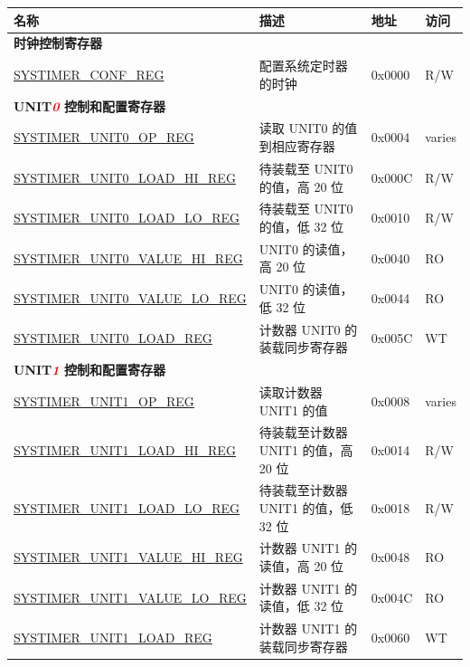 \begin{longtable}{ | p{5.5cm} | p{7.0cm} | p{1.3cm} | p{1.7cm} | }
\hline\rowcolor{lightgray}
名称 & 描述 & 地址 & 访问 \\ \hline
\endhead
\multicolumn{4}{|l|}{\textbf{时钟控制寄存器}} \\ \hline
\hyperref[regdesc:SYSTIMERCONFREG]{SYSTIMER\_CONF\_REG} & 配置系统定时器的时钟 & 0x0000 & R/W \\ \hline
\multicolumn{4}{|l|}{\textbf{UNIT\textcolor{red}{\it{0}} 控制和配置寄存器}} \\ \hline
\hyperref[regdesc:SYSTIMERUNIT0OPREG]{SYSTIMER\_UNIT0\_OP\_REG} & 读取 UNIT0 的值到相应寄存器 & 0x0004 & varies \\ \hline
\hyperref[regdesc:SYSTIMERUNIT0LOADHIREG]{SYSTIMER\_UNIT0\_LOAD\_HI\_REG} & 待装载至 UNIT0 的值，高 20 位 & 0x000C & R/W \\ \hline
\hyperref[regdesc:SYSTIMERUNIT0LOADLOREG]{SYSTIMER\_UNIT0\_LOAD\_LO\_REG} & 待装载至 UNIT0 的值，低 32 位 & 0x0010 & R/W \\ \hline
\hyperref[regdesc:SYSTIMERUNIT0VALUEHIREG]{SYSTIMER\_UNIT0\_VALUE\_HI\_REG} & UNIT0 的读值，高 20 位 & 0x0040 & RO \\ \hline
\hyperref[regdesc:SYSTIMERUNIT0VALUELOREG]{SYSTIMER\_UNIT0\_VALUE\_LO\_REG} & UNIT0 的读值，低 32 位 & 0x0044 & RO \\ \hline
\hyperref[regdesc:SYSTIMERUNIT0LOADREG]{SYSTIMER\_UNIT0\_LOAD\_REG} & 计数器 UNIT0 的装载同步寄存器 & 0x005C & WT \\ \hline
\multicolumn{4}{|l|}{\textbf{UNIT\textcolor{red}{\it{1}} 控制和配置寄存器}} \\ \hline
\hyperref[regdesc:SYSTIMERUNIT1OPREG]{SYSTIMER\_UNIT1\_OP\_REG} & 读取计数器 UNIT1 的值 & 0x0008 & varies \\ \hline
\hyperref[regdesc:SYSTIMERUNIT1LOADHIREG]{SYSTIMER\_UNIT1\_LOAD\_HI\_REG} & 待装载至计数器 UNIT1 的值，高 20 位& 0x0014 & R/W \\ \hline
\hyperref[regdesc:SYSTIMERUNIT1LOADLOREG]{SYSTIMER\_UNIT1\_LOAD\_LO\_REG} & 待装载至计数器 UNIT1 的值，低 32 位 & 0x0018 & R/W \\ \hline
\hyperref[regdesc:SYSTIMERUNIT1VALUEHIREG]{SYSTIMER\_UNIT1\_VALUE\_HI\_REG} & 计数器 UNIT1 的读值，高 20 位 & 0x0048 & RO \\ \hline
\hyperref[regdesc:SYSTIMERUNIT1VALUELOREG]{SYSTIMER\_UNIT1\_VALUE\_LO\_REG} & 计数器 UNIT1 的读值，低 32 位 & 0x004C & RO \\ \hline
\hyperref[regdesc:SYSTIMERUNIT1LOADREG]{SYSTIMER\_UNIT1\_LOAD\_REG} & 计数器 UNIT1 的装载同步寄存器 & 0x0060 & WT \\ \hline

\end{longtable}
